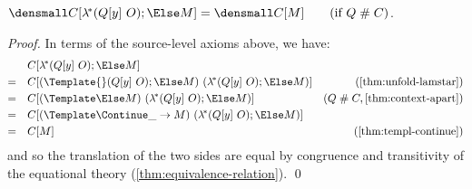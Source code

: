 \begin{lemma}
  \label{thm:context-lamstar-apart}

  $\den{C[\lamstar (Q[y] ~ O); \Else M]} = \den{C[M]}
  \qquad (\text{if } Q \apart C)$.
\end{lemma}
\begin{proof}
  In terms of the source-level axioms above, we have:
  \begin{align*}
    &\quad
    C[\lamstar (Q[y] ~ O); \Else M]
    \\
    =&\quad
    C[(\Template{} (Q[y] ~ O); \Else M) ~ (\lamstar (Q[y] ~ O); \Else M)]
    &(\cref{thm:unfold-lamstar})
    \\
    =&\quad
    C[(\Template \Else M) ~ (\lamstar (Q[y] ~ O); \Else M)]
    &(Q \apart C, \cref{thm:context-apart})
    \\
    =&\quad
    C[(\Template \Continue \_ \to M) ~ (\lamstar (Q[y] ~ O); \Else M)]
    \\
    =&\quad
    C[M]
    &(\cref{thm:templ-continue})
  \end{align*}
  and so the translation of the two sides are equal by congruence and transitivity of the equational theory (\cref{thm:equivalence-relation}).
  \qed
\end{proof}

